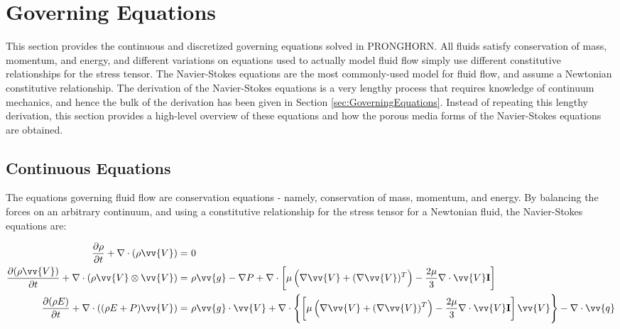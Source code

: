 \documentclass[10pt]{article}
\numberwithin{equation}{section} %
\begin{document}
\section{Governing Equations}

This section provides the continuous and discretized governing equations solved in PRONGHORN. All fluids satisfy conservation of mass, momentum, and energy, and different variations on equations used to actually model fluid flow simply use different constitutive relationships for the stress tensor. The Navier-Stokes equations are the most commonly-used model for fluid flow, and assume a Newtonian constitutive relationship. The derivation of the Navier-Stokes equations is a very lengthy process that requires knowledge of continuum mechanics, and hence the bulk of the derivation has been given in Section \ref{sec:GoverningEquations}. Instead of repeating this lengthy derivation, this section provides a high-level overview of these equations and how the porous media forms of the Navier-Stokes equations are obtained. 

\subsection{Continuous Equations}
The equations governing fluid flow are conservation equations - namely, conservation of mass, momentum, and energy. By balancing the forces on an arbitrary continuum, and using a constitutive relationship for the stress tensor for a Newtonian fluid, the Navier-Stokes equations are:

\begin{equation}
\begin{aligned}
\frac{\partial\rho}{\partial t} + \nabla\cdot(\rho\vv{V})=&\ 0\\
\frac{\partial(\rho\vv{V})}{\partial t}+\nabla\cdot(\rho\vv{V}\otimes\vv{V})=&\ \rho \vv{g}-\nabla P+\nabla\cdot\left\lbrack\mu\left(\nabla \vv{V}+(\nabla \vv{V})^T\right)-\frac{2\mu}{3}\nabla\cdot\vv{V}\textbf{I}\right\rbrack\\
\frac{\partial (\rho E)}{\partial t}+\nabla\cdot((\rho E+P)\vv{V})=&\ \rho \vv{g}\cdot\vv{V}+\nabla\cdot\left\{\left\lbrack\mu\left(\nabla \vv{V}+(\nabla \vv{V})^T\right)-\frac{2\mu}{3}\nabla\cdot\vv{V}\textbf{I}\right\rbrack\vv{V}\right\}-\nabla\cdot\vv{q}\\
\end{aligned}
\end{equation}
\end{document}
